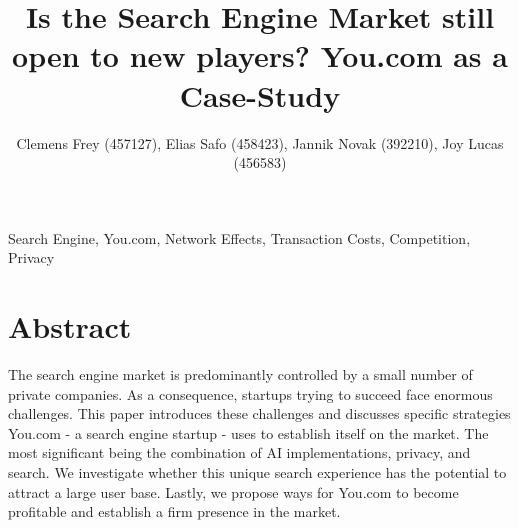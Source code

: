 \documentclass[5p,twocolumn,final]{elsarticle}
\begin{document}
\begin{frontmatter}
	\title{\LARGE\textbf{Is the Search Engine Market still open to new players? You.com as a Case-Study }}
\author{Clemens Frey (457127), Elias Safo (458423), Jannik Novak (392210), Joy Lucas (456583)}
\begin{keyword}
    Search Engine, You.com,  Network Effects, Transaction Costs, Competition, Privacy
\end{keyword}

\end{frontmatter}

{}


\section{Abstract} The search engine market is predominantly controlled by a small number of private companies. As a consequence, startups trying to succeed face enormous challenges. This paper introduces these challenges and discusses specific strategies You.com - a search engine startup - uses to establish itself on the market. The most significant being the combination of AI implementations, privacy, and search. We investigate whether this unique search experience has the potential to attract a large user base. Lastly, we propose ways for You.com to become profitable and establish a firm presence in the market.
\end{document}

